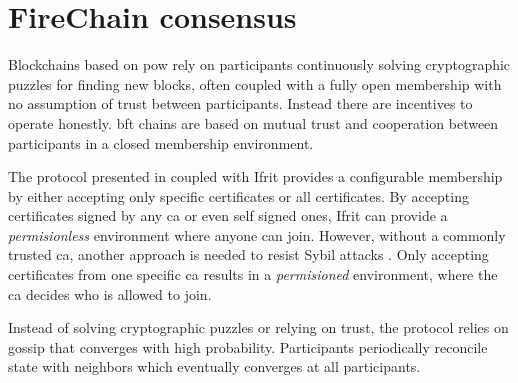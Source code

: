 \documentclass[USenglish]{uit-thesis}
\begin{document}
\section{FireChain consensus}\label{proto}

\iffalse
Blockchains based on \gls{pow} rely on participants continuously solving cryptographic puzzles for finding new blocks, often coupled with a fully open membership with no assumption of trust between participants. 
Instead there are incentives to operate honestly.
\gls{bft} chains are based on mutual trust and cooperation between participants in a closed membership environment.      

The protocol presented in \cite{vanblock} coupled with Ifrit provides a configurable membership by either accepting only specific certificates or all certificates.
By accepting certificates signed by any \gls{ca} or even self signed ones, Ifrit can provide a \textit{permisionless} environment where anyone can join.
However, without a commonly trusted \gls{ca}, another approach is needed to resist Sybil attacks \cite{sybil}.
Only accepting certificates from one specific \gls{ca} results in a \textit{permisioned} environment, where the \gls{ca} decides who is allowed to join.

Instead of solving cryptographic puzzles or relying on trust, the protocol relies on gossip that converges with high probability.
Participants periodically reconcile state with neighbors which eventually converges at all participants. 
\end{document}
